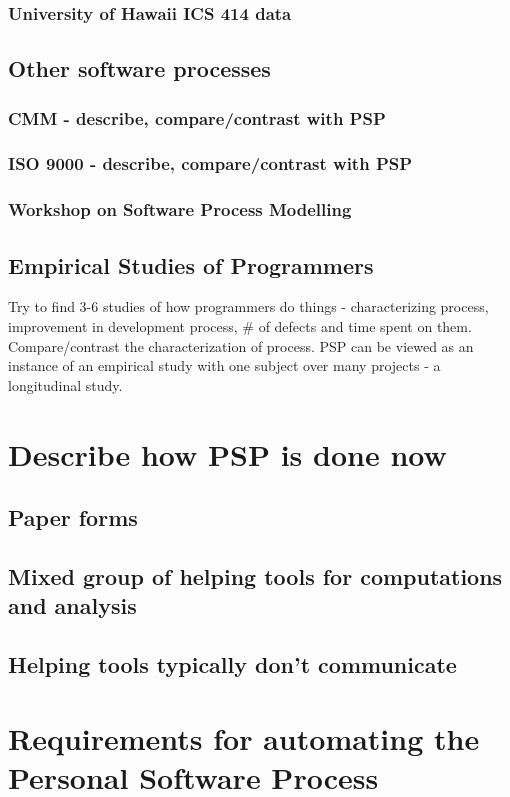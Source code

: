 \subsection{University of Hawaii ICS 414 data}
\section{Other software processes}
\subsection{CMM - describe, compare/contrast with PSP}
\subsection{ISO 9000 - describe, compare/contrast with PSP}
\subsection{Workshop on Software Process Modelling}
\section{Empirical Studies of Programmers}

Try to find 3-6 studies of how programmers do things -
characterizing process, improvement in development process, \# of defects
and time spent on them.  Compare/contrast the characterization of process.
PSP can be viewed as an instance of an empirical study with one subject
over many projects - a longitudinal study.

\chapter{Describe how PSP is done now}
\section{Paper forms}
\section{Mixed group of helping tools for computations and analysis}
\section{Helping tools typically don't communicate}
\chapter{Requirements for automating the Personal Software Process}
